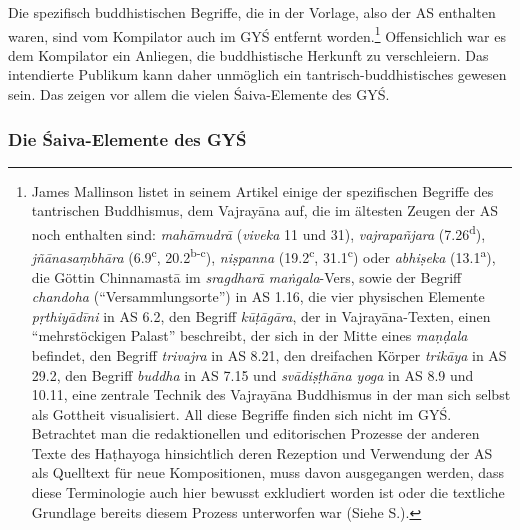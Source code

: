 \documentclass[a4paper,12pt]{article}
\begin{document}
{Die spezifisch buddhistischen Begriffe, die in der Vorlage, also der AS enthalten waren, sind vom Kompilator auch im GYŚ entfernt worden.\footnote{James Mallinson listet in seinem Artikel \parencite[8-10]{mallinson2016as} einige der spezifischen Begriffe des tantrischen Buddhismus, dem Vajrayāna auf, die im ältesten Zeugen der AS noch enthalten sind: \textit{mahāmudrā} (\textit{viveka} 11 und 31), \textit{vajrapañjara} (7.26\textsuperscript{d}), \textit{jñānasaṃbhāra} (6.9\textsuperscript{c}, 20.2\textsuperscript{b-c}), \textit{niṣpanna} (19.2\textsuperscript{c}, 31.1\textsuperscript{c}) oder \textit{abhiṣeka} (13.1\textsuperscript{a}), die Göttin Chinnamastā im \textit{sragdharā maṅgala}-Vers, sowie der Begriff \textit{chandoha} (``Versammlungsorte'') in AS 1.16, die vier physischen Elemente \textit{pṛthiyādīni} in AS 6.2, den Begriff \textit{kūṭāgāra}, der in Vajrayāna-Texten, einen ``mehrstöckigen Palast'' beschreibt, der sich in der Mitte eines \textit{maṇḍala} befindet, den Begriff \textit{trivajra} in AS 8.21, den dreifachen Körper \textit{trikāya} in AS 29.2, den Begriff \textit{buddha} in AS 7.15 und \textit{svādiṣṭhāna yoga} in AS 8.9 und 10.11, eine zentrale Technik des Vajrayāna Buddhismus in der man sich selbst als Gottheit visualisiert. All diese Begriffe finden sich nicht im GYŚ. Betrachtet man die redaktionellen und editorischen Prozesse der anderen Texte des Haṭhayoga hinsichtlich deren Rezeption und Verwendung der AS als Quelltext für neue Kompositionen, muss davon ausgegangen werden, dass diese Terminologie auch hier bewusst exkludiert worden ist oder die textliche Grundlage bereits diesem Prozess unterworfen war (Siehe S.\pageref{tabelle}).} Offensichlich war es dem Kompilator ein Anliegen, die buddhistische Herkunft zu verschleiern. Das intendierte Publikum kann daher unmöglich ein tantrisch-buddhistisches gewesen sein. Das zeigen vor allem die vielen Śaiva-Elemente des GYŚ.

\subsubsection{Die Śaiva-Elemente des GYŚ}
\label{shaivaelemente}

}
\end{document}
